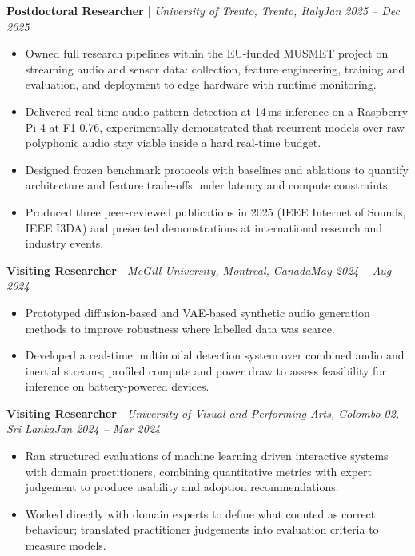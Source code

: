 \documentclass[11pt]{article}
\newenvironment{cvrole}[5]{%
  \par\noindent\textbf{\large #1} | \textit{\small #2, #3}\hfill \textit{\small #4 -- #5}\par
  \begin{itemize}[leftmargin=2em, itemsep=-0.3em, topsep=-0.5em]%
}{%
  \end{itemize}\par\noindent\mbox{}\par\vspace{0.1em}%
}
\begin{document}
\begin{cvrole}{Postdoctoral Researcher}{University of Trento}{Trento, Italy}{Jan 2025}{Dec 2025}
    \item Owned full research pipelines within the EU-funded MUSMET project on streaming audio and sensor data: collection, feature engineering, training and evaluation, and deployment to edge hardware with runtime monitoring.
    \item Delivered real-time audio pattern detection at 14\,ms inference on a Raspberry Pi 4 at F1 0.76, experimentally demonstrated that recurrent models over raw polyphonic audio stay viable inside a hard real-time budget.
    \item Designed frozen benchmark protocols with baselines and ablations to quantify architecture and feature trade-offs under latency and compute constraints.
    \item Produced three peer-reviewed publications in 2025 (IEEE Internet of Sounds, IEEE I3DA) and presented demonstrations at international research and industry events.
\end{cvrole}

\begin{cvrole}{Visiting Researcher}{McGill University}{Montreal, Canada}{May 2024}{Aug 2024}
    \item Prototyped diffusion-based and VAE-based synthetic audio generation methods to improve robustness where labelled data was scarce.
    \item Developed a real-time multimodal detection system over combined audio and inertial streams; profiled compute and power draw to assess feasibility for inference on battery-powered devices.
\end{cvrole}

\begin{cvrole}{Visiting Researcher}{University of Visual and Performing Arts}{Colombo 02, Sri Lanka}{Jan 2024}{Mar 2024}
    \item Ran structured evaluations of machine learning driven interactive systems with domain practitioners, combining quantitative metrics with expert judgement to produce usability and adoption recommendations.
    \item Worked directly with domain experts to define what counted as correct behaviour; translated practitioner judgements into evaluation criteria to measure models.
\end{cvrole}
\end{document}
